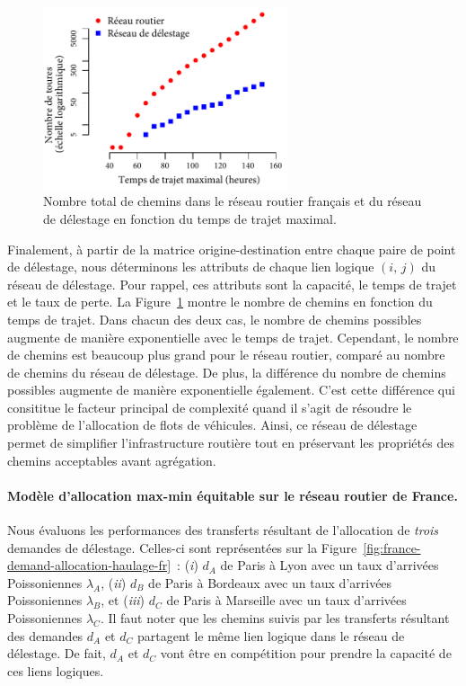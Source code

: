 \begin{figure}
    \vspace{-15pt}
    \includegraphics[width=7.2cm]{figures-fr/pathcount-fr.pdf}
    \caption{Nombre total de chemins dans le réseau routier français et du réseau de délestage en fonction du temps de trajet maximal.}
    \label{fig:pathcount-fr}
\end{figure}
Finalement, à partir de la matrice origine-destination entre chaque paire de point de délestage, nous déterminons les attributs de chaque lien logique $(i,\,j)$ du réseau de délestage. Pour rappel, ces attributs sont la capacité, le temps de trajet et le taux de perte.  
La Figure~\ref{fig:pathcount-fr} montre le nombre de chemins en fonction du temps de trajet. Dans chacun des deux cas, le nombre de chemins possibles augmente de manière exponentielle avec le temps de trajet. Cependant, le nombre de chemins est beaucoup plus grand pour le réseau routier, comparé au nombre de chemins du réseau de délestage. De plus, la différence du nombre de chemins possibles augmente de manière exponentielle également. C’est cette différence qui consititue le facteur principal de complexité quand il s'agit de résoudre le problème de l'allocation de flots de véhicules. Ainsi, ce réseau de délestage permet de simplifier l’infrastructure routière tout en préservant les propriétés des chemins acceptables avant agrégation. 
 
\paragraph{Modèle d’allocation max-min équitable sur le réseau routier de France.} 
Nous évaluons les performances des transferts résultant de l’allocation de \textit{trois} demandes de délestage. Celles-ci sont représentées sur la Figure~\ref{fig:france-demand-allocation-haulage-fr}~:  
(\textit{i}) $d_A$ de Paris à Lyon avec un taux d’arrivées Poissoniennes $\lambda_A$,  
(\textit{ii}) $d_B$ de Paris à Bordeaux avec un taux d’arrivées Poissoniennes $\lambda_B$, et  
(\textit{iii}) $d_C$ de Paris à Marseille avec un taux d’arrivées Poissoniennes $\lambda_C$. Il faut noter que les chemins suivis par les transferts résultant des demandes $d_A$ et $d_C$ partagent le même lien logique dans le réseau de délestage. De fait, $d_A$ et $d_C$ vont être en compétition pour prendre la capacité de ces liens logiques.  
 
